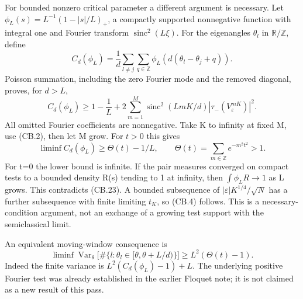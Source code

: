 For bounded nonzero critical parameter a different argument is necessary. Let \(\phi_L(s)=L^{-1}(1-|s|/L)_+\), a compactly supported nonnegative function with integral one and Fourier transform \(\operatorname{sinc}^2(L\xi)\). For the eigenangles \(\theta_{l}\) in \(\mathbb R/\mathbb Z\), define \[
 C_d(\phi_L)=\frac1d\sum_{l\ne j}\sum_{q\in\mathbb Z}
                       \phi_L(d(\theta_l-\theta_j+q)).
\] Poisson summation, including the zero Fourier mode and the removed diagonal, proves, for \(d>L\), \[
 C_d(\phi_L)\geq1-\frac1L+
       2\sum_{m=1}^{M}\operatorname{sinc}^2(LmK/d)
                                 |\tau_-(V_\varepsilon^{mK})|^2. \tag{CB.22}
\] All omitted Fourier coefficients are nonnegative. Take K to infinity at fixed M, use (CB.2), then let M grow. For \(t>0\) this gives \[
 \liminf C_d(\phi_L)\geq\Theta(t)-1/L,\qquad
 \Theta(t)=\sum_{m\in\mathbb Z}e^{-m^2t^2}>1.                  \tag{CB.23}
\] For t=0 the lower bound is infinite. If the pair measures converged on compact tests to a bounded density R(s) tending to 1 at infinity, then \(\int\phi_LR\to1\) as L grows. This contradicts (CB.23). A bounded subsequence of \(|\varepsilon|K^{1/4}/\sqrt N\) has a further subsequence with finite limiting \(t_{K}\), so (CB.4) follows. This is a necessary-condition argument, not an exchange of a growing test support with the semiclassical limit.

An equivalent moving-window consequence is \[
 \liminf\operatorname{Var}_{\theta}\!\bigl[
      \#\{l:\theta_l\in[\theta,\theta+L/d)\}\bigr]
       \geq L^2(\Theta(t)-1).
\] Indeed the finite variance is \(L^2(C_d(\phi_L)-1)+L\). The underlying positive Fourier test was already established in the earlier Floquet note; it is not claimed as a new result of this pass.

